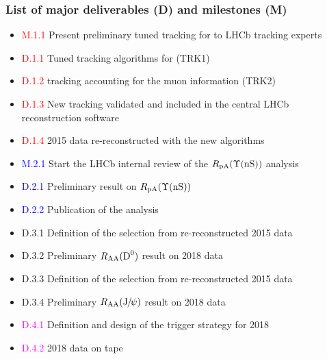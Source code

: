 \documentclass[a4paper,11pt]{article}
\begin{document}

\subsubsection*{List of major deliverables (D) and milestones (M)}

\begin{itemize}
 \item \textcolor{red}{M.1.1} Present preliminary tuned tracking for \pbpb to LHCb tracking experts
 \item \textcolor{red}{D.1.1} Tuned tracking algorithms for \pbpb (TRK1)
 \item \textcolor{red}{D.1.2} \pbpb tracking accounting for the muon information (TRK2)
 \item \textcolor{red}{D.1.3} New \pbpb tracking validated and included in the central LHCb reconstruction software
 \item \textcolor{red}{D.1.4} 2015 data re-reconstructed with the new algorithms
 \item \textcolor{blue}{M.2.1} Start the LHCb internal review of the $R_{\text{pA}} (\Upsilon\text{(nS)})$ analysis
 \item \textcolor{blue}{D.2.1} Preliminary result on $R_{\text{pA}} (\Upsilon\text{(nS)})$
 \item \textcolor{blue}{D.2.2} Publication of the analysis
 \item \textcolor{green!50!black}{D.3.1} Definition of the \Dz selection from re-reconstructed 2015 \pbpb data
 \item \textcolor{green!50!black}{D.3.2} Preliminary $R_{\text{AA}}(\text{D}^0)$ result on 2018 \pbpb data
 \item \textcolor{green!50!black}{D.3.3} Definition of the \Jpsi selection from re-reconstructed 2015 \pbpb data
 \item \textcolor{green!50!black}{D.3.4} Preliminary $R_{\text{AA}}(\text{J}\hspace{-.08em}/\hspace{-.14em}\psi)$ result on 2018 \pbpb data
 \item \textcolor{magenta}{D.4.1} Definition and design of the trigger strategy for 2018 \pbpb
 \item \textcolor{magenta}{D.4.2} 2018 \pbpb data on tape
\end{itemize}
\end{document}
